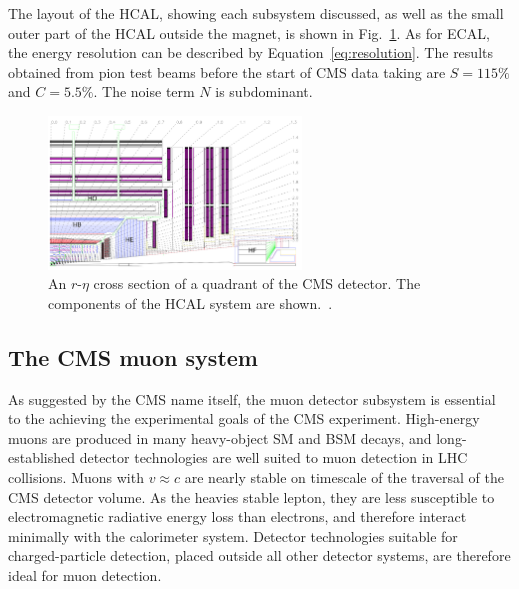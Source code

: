 The layout of the HCAL, showing each subsystem discussed, as well as the small
outer part of the HCAL outside the magnet, is shown in Fig.~\ref{fig:hcal}.
As for ECAL, the energy resolution can be described by Equation~\ref{eq:resolution}.
The results obtained from pion test beams before the start of CMS
data taking are $S=115\%$ and $C = 5.5\%$. The noise term $N$ is subdominant.

\begin{figure}[htbp]
  \centering
   \includegraphics[width=0.6\textwidth]{figures/LHCandCMS/HCAL.png}
  \caption[An $r$-$\eta$ cross section of a quadrant of the CMS detector, showing the 
      HCAL system]{
    An $r$-$\eta$ cross section of a quadrant of the CMS detector. The components
    of the HCAL system are shown.~\cite{Chatrchyan:2012xdj}.
        }
 \label{fig:hcal}
\end{figure}

\subsection{The CMS muon system}

As suggested by the CMS name itself, the muon detector subsystem is essential to the
achieving the experimental goals of the CMS experiment. 
High-energy muons are produced in many heavy-object SM and BSM 
decays, and long-established detector technologies are well suited to muon detection in LHC collisions.
Muons with $v\approx c$ are nearly stable
on timescale of the traversal of the CMS detector volume. As the heavies stable lepton, 
they are less susceptible to electromagnetic radiative energy loss than electrons, and therefore
interact minimally with the calorimeter system. Detector technologies suitable for
charged-particle detection, placed outside all other detector systems, 
are therefore ideal for muon detection. 

